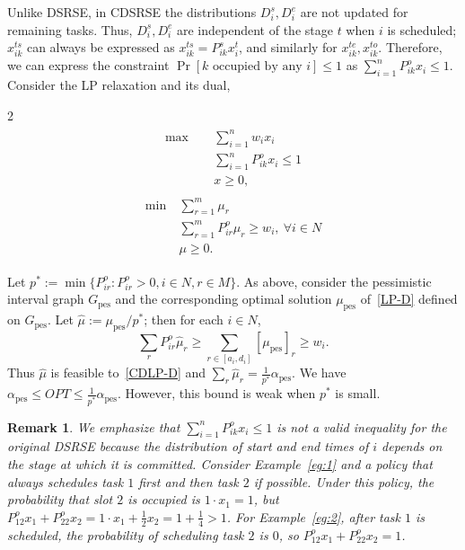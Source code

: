 \documentclass[final,5p,times,twocolumn]{elsarticle}
\newtheorem{remark}[theorem]{Remark}
\DeclareMathOperator{\pes}{pes}
\begin{document}
Unlike DSRSE, in CDSRSE the distributions $D_i^s, D_i^e$ are not updated for remaining tasks.
Thus, $D_i^s,D_i^e$ are independent of the stage $t$ when $i$ is scheduled; $x_{ik}^{ts}$ can always be expressed as $x_{ik}^{ts}=P_{ik}^{s}x^t_i$, and similarly for $x_{ik}^{te}, x_{ik}^{to}$.
Therefore, we can express the constraint $\Pr[\text{$k$ occupied by any $i$}]\leq 1$ as $\sum_{i=1}^{n}P_{ik}^o x_i\leq 1$.
Consider the LP relaxation and its dual,
\begin{multicols}{2}
\noindent
\begin{align*}
\label{CDLP-P}
\tag{CDLP-P}
\begin{split}
    \max\quad~&\sum_{i=1}^{n}w_ix_i\\
    & \sum_{i=1}^{n}P_{ik}^o x_i\leq1\\
    &x\geq 0,
    \end{split}
\end{align*}   
\columnbreak
\begin{align*}
\label{CDLP-D}
\tag{CDLP-D}
\begin{split}
    \min~&\sum_{r=1}^{m}\mu_r\\
    &\sum_{r=1}^{m}P^o_{ir}\mu_r\geq w_i,~\forall i\in N\\
    &\mu\geq 0.
    \end{split}
\end{align*}
\end{multicols}
%
\noindent
Let $p^*:=\min\{P_{ir}^o:P_{ir}^o>0, i\in N,r\in M\}$.
As above, consider the pessimistic interval graph $G_\pes$ and the corresponding optimal solution $\mu_{\pes}$ of~\eqref{LP-D} defined on $G_\pes$.
Let $\hat{\mu}:=\mu_{\pes}/p^*$; then for each $i\in N$,
\[\sum_{r}P_{ir}^o\hat{\mu}_r\geq \sum_{r\in [a_i,d_i]} [\mu_{\pes}]_r\geq w_i.\]
Thus $\hat{\mu}$ is feasible to~\eqref{CDLP-D} and $\sum_{r}\hat{\mu}_r = \frac{1}{p^*}\alpha_{\pes}.$
We have $\alpha_{\pes}\leq OPT\leq \frac{1}{p^*}\alpha_{\pes}$.
However, this bound is weak when $p^*$ is small.
\begin{remark}
    We emphasize that $\sum_{i=1}^{n}P_{ik}^{o}x_i\leq 1$ is not a valid inequality for the original DSRSE because the distribution of start and end times of $i$ depends on the stage at which it is committed. 
Consider Example~\ref{eg:1} and a policy that always schedules task $1$ first and then task $2$ if possible.
Under this policy, the probability that slot $2$ is occupied is $1\cdot x_1 = 1$, but $P_{12}^ox_1+P_{22}^o x_2= 1\cdot x_1+\frac{1}{2}x_2=1+\frac{1}{4}>1$.
For Example~\ref{eg:2}, after task $1$ is scheduled, the probability of scheduling task $2$ is $0$, so $P_{12}^ox_1+P_{22}^o x_2= 1$.
\end{remark}
\end{document}
